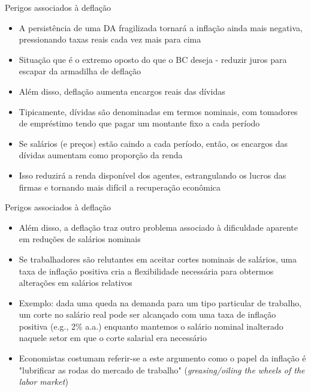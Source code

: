 \documentclass[10pt]{beamer}
\begin{document}
\begin{frame}
    {Perigos associados à deflação}
    \begin{itemize}
        \item A persistência de uma DA fragilizada tornará a inflação ainda mais negativa, pressionando taxas reais cada vez mais para cima\bigskip
        \item Situação que é o extremo oposto do que o BC deseja - reduzir juros para escapar da armadilha de deflação\bigskip
        \item Além disso, deflação aumenta encargos reais das dívidas\bigskip
        \item Tipicamente, dívidas são denominadas em termos nominais, com tomadores de empréstimo tendo que pagar um montante fixo a cada período\bigskip
        \item Se salários (e preços) estão caindo a cada período, então, os encargos das dívidas aumentam como proporção da renda\bigskip
        \item Isso reduzirá a renda disponível dos agentes, estrangulando os lucros das firmas e tornando mais difícil a recuperação econômica
    \end{itemize}
\end{frame}

\begin{frame}
    {Perigos associados à deflação}
    \begin{itemize}
        \item Além disso, a deflação traz outro problema associado à dificuldade aparente em reduções de salários nominais\bigskip
        \item Se trabalhadores são relutantes em aceitar cortes nominais de salários, uma taxa de inflação positiva cria a flexibilidade necessária para obtermos alterações em salários relativos\bigskip
        \item Exemplo: dada uma queda na demanda para um tipo particular de trabalho, um corte no salário real pode ser alcançado com uma taxa de inflação positiva (e.g., 2\% a.a.) enquanto mantemos o salário nominal inalterado naquele setor em que o corte salarial era necessário\bigskip
        \item Economistas costumam referir-se a este argumento como o papel da inflação é "lubrificar as rodas do mercado de trabalho" (\emph{greasing/oiling the wheels of the labor market})
    \end{itemize}
\end{frame}
\end{document}
